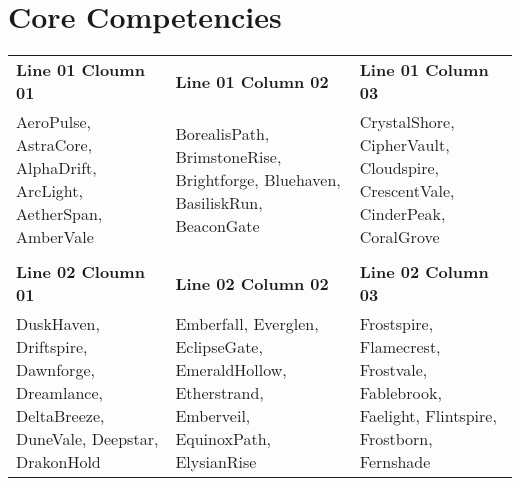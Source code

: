 \section*{Core Competencies}
\vspace{-0.6em}
\renewcommand{\arraystretch}{1.2}
\begin{longtable}{
>{\raggedright\arraybackslash}p{} 
>{\raggedright\arraybackslash}p{} 
>{\raggedright\arraybackslash}p{}}

\textbf{Line 01 Cloumn 01} & 
\textbf{Line 01 Column 02} & 
\textbf{Line 01 Column 03} \\
AeroPulse, AstraCore, AlphaDrift, ArcLight, AetherSpan, AmberVale
& BorealisPath, BrimstoneRise, Brightforge, Bluehaven, BasiliskRun, BeaconGate
& CrystalShore, CipherVault, Cloudspire, CrescentVale, CinderPeak, CoralGrove \\
\\[-1em]

\textbf{Line 02 Cloumn 01} & 
\textbf{Line 02 Column 02} & 
\textbf{Line 02 Column 03} \\
DuskHaven, Driftspire, Dawnforge, Dreamlance, DeltaBreeze, DuneVale, Deepstar, DrakonHold
& Emberfall, Everglen, EclipseGate, EmeraldHollow, Etherstrand, Emberveil, EquinoxPath, ElysianRise
& Frostspire, Flamecrest, Frostvale, Fablebrook, Faelight, Flintspire, Frostborn, Fernshade \\
\end{longtable}
